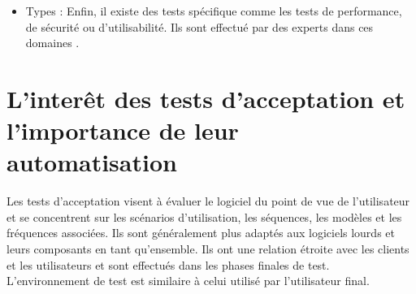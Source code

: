 \begin{itemize}
\item Types : Enfin, il existe des tests spécifique comme les tests de performance, de sécurité ou d'utilisabilité. Ils sont effectué par des experts dans ces domaines \parencite{classification}.



\end{itemize}



\section[les tests d'acceptation et l'automatisation]{L'interêt des tests d'acceptation et l'importance de leur automatisation}
Les tests d'acceptation visent à évaluer le logiciel du point de vue de l'utilisateur et se concentrent sur les scénarios d'utilisation, les séquences, les modèles et les fréquences associées. Ils sont généralement plus adaptés aux logiciels lourds et leurs composants en tant qu'ensemble. Ils ont une relation étroite avec les clients et les utilisateurs et sont effectués dans les phases finales de test. L'environnement de test est similaire à celui utilisé par l'utilisateur final. 



